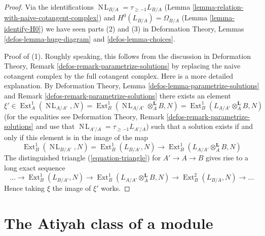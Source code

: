 \documentclass{stacks-project}
\theoremstyle{plain}
\theoremstyle{definition}
\theoremstyle{remark}
\numberwithin{equation}{subsection}
\def\Ext{\mathop{\mathrm{Ext}}\nolimits}
\def\NL{\mathop{N\!L}\nolimits}
\begin{document}
\begin{proof}
Via the identifications $\NL_{B/A} = \tau_{\geq -1}L_{B/A}$
(Lemma \ref{lemma-relation-with-naive-cotangent-complex}) and
$H^0(L_{B/A}) = \Omega_{B/A}$ (Lemma \ref{lemma-identify-H0})
we have seen parts (2) and (3) in
Deformation Theory, Lemmas \ref{defos-lemma-huge-diagram} and
\ref{defos-lemma-choices}.

\medskip\noindent
Proof of (1). Roughly speaking, this follows from the discussion in 
Deformation Theory, Remark \ref{defos-remark-parametrize-solutions}
by replacing the naive cotangent complex by the full cotangent complex.
Here is a more detailed explanation. By
Deformation Theory, Lemma \ref{defos-lemma-parametrize-solutions}
and Remark \ref{defos-remark-parametrize-solutions}
there exists an element
$$
\xi' \in
\Ext^1_A(\NL_{A/A'}, N) =
\Ext^1_B(\NL_{A/A'} \otimes_A^\mathbf{L} B, N) =
\Ext^1_B(L_{A/A'} \otimes_A^\mathbf{L} B, N)
$$
(for the equalities see Deformation Theory, Remark
\ref{defos-remark-parametrize-solutions} and use that
$\NL_{A'/A} = \tau_{\geq -1} L_{A'/A}$)
such that a solution exists if and only if this element is in
the image of the map
$$
\Ext^1_B(\NL_{B/A'}, N) = \Ext^1_B(L_{B/A'}, N)
\longrightarrow
\Ext^1_B(L_{A/A'} \otimes_A^\mathbf{L} B, N)
$$
The distinguished triangle (\ref{equation-triangle})
for $A' \to A \to B$ gives rise to a long exact sequence
$$
\ldots \to
\Ext^1_B(L_{B/A'}, N) \to
\Ext^1_B(L_{A/A'} \otimes_A^\mathbf{L} B, N) \to
\Ext^2_B(L_{B/A}, N) \to \ldots
$$
Hence taking $\xi$ the image of $\xi'$ works.
\end{proof}





\section{The Atiyah class of a module}
\label{section-atiyah}
\end{document}
